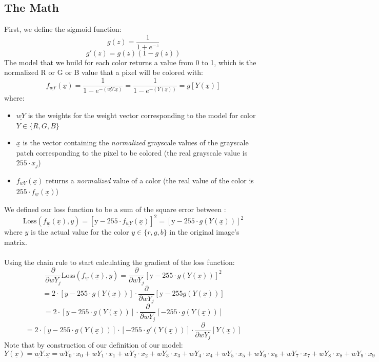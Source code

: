 \documentclass[11pt]{article}
\begin{document}
\subsection{The Math}
First, we define the sigmoid function:
\[
g(z) = \frac{1}{1+e^{-z}}
\]
\[
g'(z) = g(z)(1-g(z))
\]
The model that we build for each color returns a value from 0 to 1, which is the normalized R or G or B value that a pixel will be colored with:
\[
f_{\underline{wY}}(\underline{x}) = \frac{1}{1 - e^{-(\underline{wY}. \underline{x})}} = \frac{1}{1 - e^{-(Y(\underline{x}))}} = g[Y(\underline{x})]
\]
where:
\begin{itemize}
\item $\underline{wY}$ is the weights for the weight vector corresponding to the model for color $Y \in \{R, G, B\}$
\item $\underline{x}$ is the vector containing the \textit{normalized }grayscale values of the grayscale patch corresponding to the pixel to be colored (the real grayscale value is $255\cdot x_j$)
\item $f_{\underline{wY}}(\underline{x})$ returns a \textit{normalized} value of a color (the real value of the color is $255\cdot f_{\underline{w}}(\underline{x})$)
\end{itemize}
We defined our loss function to be a sum of the square error between :
\[
\text{Loss}(f_{\underline{w}}(\underline{x}),y) = [\text{y} - 255\cdot f_{\underline{wY}}(\underline{x})]^2 = [\text{y} - 255\cdot g(Y(\underline{x}))]^2
\]
where $y$ is the actual value for the color $y \in \{r, g, b\}$ in the original image's matrix.\\\\
Using the chain rule to start calculating the gradient of the loss function:
\[
\frac{\partial}{\partial wY_j}\text{Loss}(f_{\underline{w}}(\underline{x}),y) = \frac{\partial}{\partial wY_j}\left[\text{y} - 255\cdot g(Y(\underline{x}))\right]^2
\]
\[
= 2\cdot[y - 255\cdot g(Y(\underline{x}))]\cdot\frac{\partial}{\partial wY_j}[\text{y} - 255g(Y(\underline{x}))]
\]
\[
= 2\cdot\left[y - 255\cdot g(Y(\underline{x}))\right]\cdot\frac{\partial}{\partial wY_j}[-255\cdot g(Y(\underline{x}))] 
\]
\[
=  2\cdot[y - 255\cdot g(Y(\underline{x}))]\cdot[-255\cdot g'(Y(\underline{x}))]\cdot\frac{\partial}{\partial wY_j}[Y(\underline{x})]
\]
Note that by construction of our definition of our model:
\[
Y(\underline{x}) = \underline{wY}.\underline{x} = wY_0\cdot x_0 + wY_1\cdot x_1 + wY_2\cdot x_2 + wY_3\cdot x_3 + wY_4\cdot x_4 + wY_5\cdot x_5 + wY_6\cdot x_6 + wY_7\cdot x_7 + wY_8\cdot x_8 + wY_9\cdot x_9
\]
\end{document}
